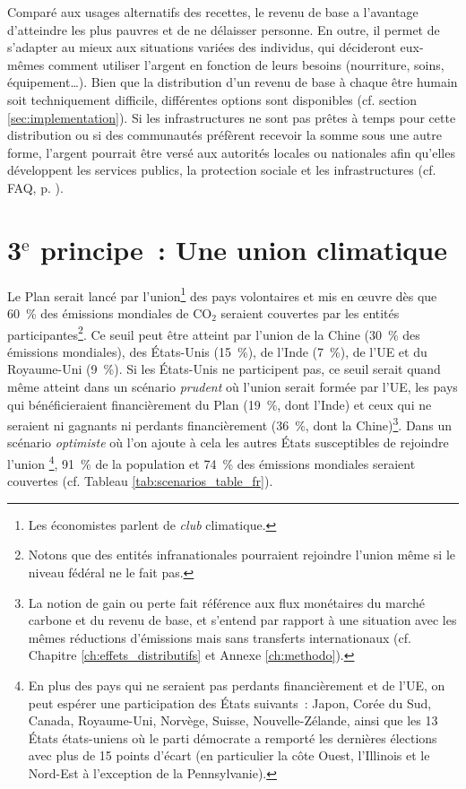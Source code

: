 \documentclass[a5paper,french,openany]{memoir}
\begin{document}
Comparé aux usages alternatifs des recettes, le revenu de base a l'avantage d'atteindre les plus pauvres et de ne délaisser personne. En outre, il permet de s'adapter au mieux aux situations variées des individus, qui décideront eux-mêmes comment utiliser l'argent en fonction de leurs besoins (nourriture, soins, équipement\dots{}). 
Bien que la distribution d'un revenu de base à chaque être humain soit techniquement difficile, différentes options sont disponibles %
(cf. section \ref{sec:implementation}). Si les infrastructures ne sont pas prêtes à temps pour cette distribution ou si des communautés préfèrent recevoir la somme sous une autre forme, l'argent pourrait être versé aux autorités locales ou nationales afin qu'elles développent les services publics, la protection sociale et les infrastructures (cf. FAQ, p. \pageref{q:rdb}). 

\section{3$^\text{e}$ principe~: Une union climatique}

Le Plan serait lancé par l'union\footnote{Les économistes parlent de \textit{club} climatique.} des pays volontaires et mis en œuvre dès que 60~\% des émissions mondiales de CO$_\text{2}$ seraient couvertes par les entités participantes\footnote{Notons que des entités infranationales pourraient rejoindre l'union même si le niveau fédéral ne le fait pas.}. Ce seuil peut être atteint par l'union de la Chine (30~\% des émissions mondiales), des États-Unis (15~\%), de l'Inde (7~\%), de l'UE et du Royaume-Uni (9~\%). Si les États-Unis ne participent pas, ce seuil serait quand même atteint dans un scénario \textit{prudent} où l'union serait formée par l'UE, les pays qui bénéficieraient financièrement du Plan (19~\%, dont l'Inde) et ceux qui ne seraient ni gagnants ni perdants financièrement (36~\%, dont la Chine)\footnote{La notion de gain ou perte fait référence aux flux monétaires du marché carbone et du revenu de base, et s'entend par rapport à une situation avec les mêmes réductions d'émissions mais sans transferts internationaux (cf. Chapitre \ref{ch:effets_distributifs} et Annexe \ref{ch:methodo}).}. %
Dans un scénario \textit{optimiste} où l'on ajoute à cela les autres États susceptibles de rejoindre l'union%
\footnote{En plus des pays qui ne seraient pas perdants financièrement et de l'UE, on peut espérer une participation des États suivants~: Japon, Corée du Sud, Canada, Royaume-Uni, Norvège, Suisse, Nouvelle-Zélande, ainsi que les 13 États états-uniens où le parti démocrate a remporté les dernières élections avec plus de 15 points d'écart (en particulier la côte Ouest, l'Illinois et le Nord-Est à l'exception de la Pennsylvanie).}, 
91~\% de la population et 74~\% des émissions mondiales seraient couvertes (cf. Tableau \ref{tab:scenarios_table_fr}). 
\end{document}
